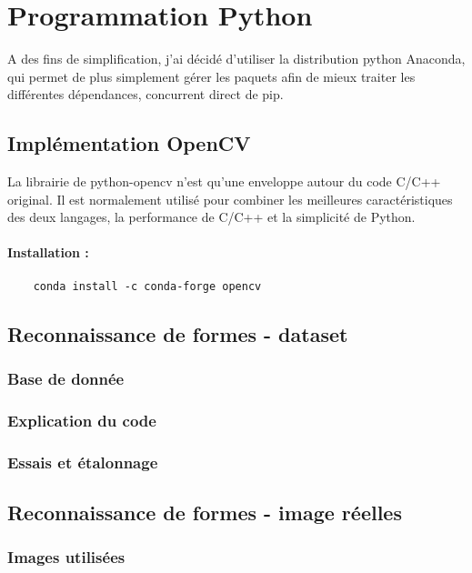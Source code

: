 \clearpage
\section{Programmation Python}
A des fins de simplification, j'ai décidé d'utiliser la distribution python Anaconda, qui permet de plus simplement gérer les paquets afin de mieux traiter les différentes dépendances, concurrent direct de pip.

\subsection{Implémentation OpenCV}
La librairie de python-opencv n'est qu'une enveloppe autour du code C/C++ original. Il est normalement utilisé pour combiner les meilleures caractéristiques des deux langages, la performance de C/C++ et la simplicité de Python.

\paragraph{Installation :}
\begin{verbatim}
	conda install -c conda-forge opencv
\end{verbatim}

\subsection{Reconnaissance de formes - dataset}

	\subsubsection{Base de donnée}

	\subsubsection{Explication du code}
	
	\subsubsection{Essais et étalonnage}
	
\clearpage	
\subsection{Reconnaissance de formes - image réelles}

	\subsubsection{Images utilisées}
	
